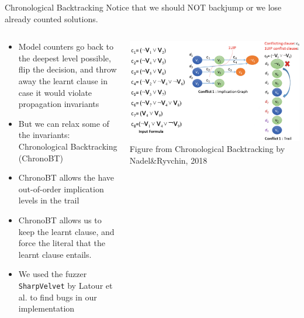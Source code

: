 \documentclass[aspectratio=169]{beamer}
\begin{document}
\begin{frame}{Chronological Backtracking}
Notice that we should NOT backjump or we lose already counted solutions.
\begin{columns}
\begin{column}{0.45\textwidth}
  \small
\begin{itemize}
  \item Model counters go back to the deepest level possible, flip the
    decision, and throw away the learnt clause in case it would violate
    propagation invariants
  \item But we can relax some of the invariants: Chronological Backtracking
    (ChronoBT)
  \item ChronoBT allows the have out-of-order implication levels in the
    trail
  \item ChronoBT allows us to keep the learnt clause, and force
    the literal that the learnt clause entails.
  \item We used the fuzzer \texttt{SharpVelvet} by Latour et al. to find bugs
    in our implementation
\end{itemize}
\end{column}
\begin{column}{0.55\textwidth}
\begin{center}
  \includegraphics[scale=0.9]{chronoBT.png}
  \small Figure from \color{blue}Chronological Backtracking by Nadel\&Ryvchin, 2018
\end{center}
\end{column}
\end{columns}
\end{frame}
\end{document}
